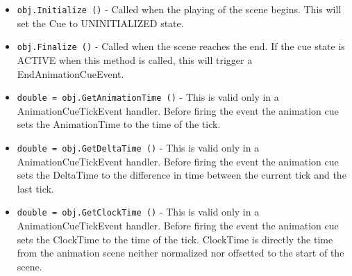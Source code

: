 \begin{itemize}
\item  \verb|obj.Initialize ()| -  Called when the playing of the scene begins.
 This will set the Cue to UNINITIALIZED state.

\item  \verb|obj.Finalize ()| -  Called when the scene reaches the end.
 If the cue state is ACTIVE when this method is called, this will
 trigger a EndAnimationCueEvent.

\item  \verb|double = obj.GetAnimationTime ()| -  This is valid only in a AnimationCueTickEvent handler. 
 Before firing the event the animation cue sets the AnimationTime to
 the time of the tick.

\item  \verb|double = obj.GetDeltaTime ()| -  This is valid only in a AnimationCueTickEvent handler.
 Before firing the event the animation cue sets the DeltaTime
 to the difference in time between the current tick and the last tick.

\item  \verb|double = obj.GetClockTime ()| -  This is valid only in a AnimationCueTickEvent handler. 
 Before firing the event the animation cue sets the ClockTime to
 the time of the tick. ClockTime is directly the time from the animation
 scene neither normalized nor offsetted to the start of the scene.

\end{itemize}
